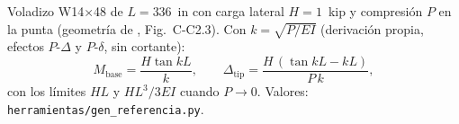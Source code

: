 Voladizo W14$\times$48 de $L=336$~in con carga lateral $H=1$~kip y compresión $P$ en la punta (geometría de \cite{aisc16}, Fig.~C-C2.3). Con $k=\sqrt{P/EI}$ (derivación propia, efectos $P$-$\Delta$ y $P$-$\delta$, sin cortante):
\[
M_\text{base}=\frac{H\tan kL}{k},\qquad \Delta_\text{tip}=\frac{H\,(\tan kL-kL)}{P\,k},
\]
con los límites $HL$ y $HL^3/3EI$ cuando $P\to0$. Valores: \texttt{herramientas/gen\_referencia.py}.
